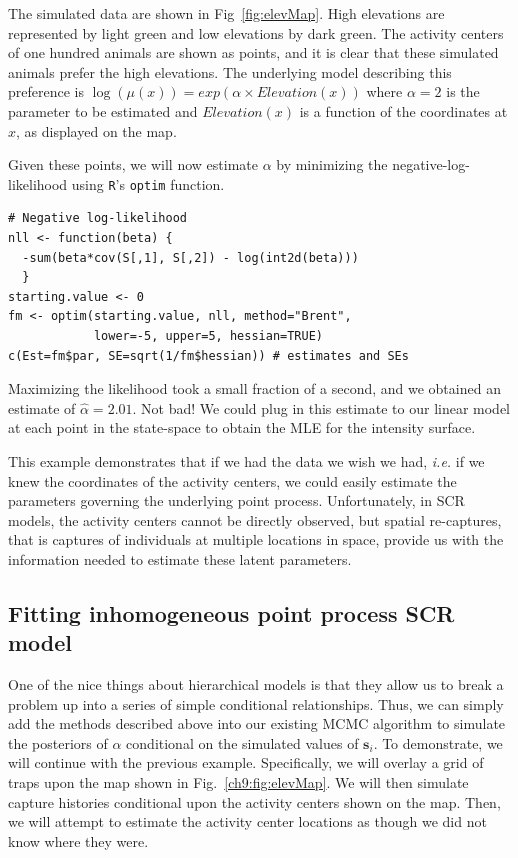 The simulated data are shown in Fig~\ref{fig:elevMap}. High elevations
are represented by light green and low elevations by dark green. The
activity centers of one hundred animals are shown as
points, and it is clear that these simulated animals prefer the high
elevations.  The underlying model describing this preference is
$\log(\mu(x)) = exp(\alpha \times Elevation(x))$
where $\alpha=2$ is the parameter to be estimated and $Elevation(x)$
is a function of the coordinates at $x$, as displayed on the map.

Given these points, we will now estimate $\alpha$ by minimizing the
negative-log-likelihood using \verb+R+'s \verb+optim+ function. 

\begin{small}
\begin{verbatim}
# Negative log-likelihood
nll <- function(beta) {
  -sum(beta*cov(S[,1], S[,2]) - log(int2d(beta)))
  }
starting.value <- 0
fm <- optim(starting.value, nll, method="Brent",
            lower=-5, upper=5, hessian=TRUE)
c(Est=fm$par, SE=sqrt(1/fm$hessian)) # estimates and SEs
\end{verbatim}
\end{small}


Maximizing the likelihood took a small fraction of a second, and we
obtained an estimate of $\hat{\alpha}=2.01$. Not bad! We could plug in
this estimate to our linear model at each point in the state-space to
obtain the MLE for the intensity surface.

This example demonstrates
that if we had the data we wish we had, {\it i.e.} if we knew the
coordinates of the activity centers, we could easily estimate the
parameters governing the underlying point process. Unfortunately, in
SCR models, the activity centers cannot be directly observed, but
spatial re-captures, that is captures of individuals at
multiple locations in space, provide us with the information needed to
estimate these latent parameters.

\subsection{Fitting inhomogeneous point process SCR model}

One of the nice things about hierarchical models is that they allow us
to break a problem up into a series of simple conditional
relationships. Thus,
we can simply add the methods described above into our existing MCMC
algorithm to simulate the posteriors of $\alpha$ conditional on the
simulated values of $\mathbf{s}_i$. To demonstrate, we will continue with
the previous example. Specifically, we will overlay a grid of
traps upon the map shown in Fig.~\ref{ch9:fig:elevMap}. We will then
simulate capture histories conditional upon the activity centers shown
on the map. Then, we will attempt to estimate the activity center
locations as though we did not know where they were.



